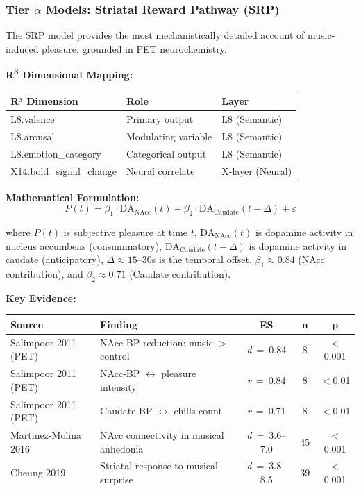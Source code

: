 \documentclass[9pt,onecolumn]{article}
\newcommand{\Rthree}{R\textsuperscript{3}}
\newcommand{\cohend}[1]{\textit{d}~=~#1}
\newcommand{\correlation}[1]{\textit{r}~=~#1}
\begin{document}
\subsubsection{Tier $\alpha$ Models: Striatal Reward Pathway (SRP)}

The SRP model provides the most mechanistically detailed account of music-induced pleasure, grounded in PET neurochemistry.

\textbf{\Rthree{} Dimensional Mapping:}
\begin{center}
\small
\begin{tabular}{@{}lll@{}}
\toprule
\textbf{R³ Dimension} & \textbf{Role} & \textbf{Layer} \\
\midrule
L8.valence & Primary output & L8 (Semantic) \\
L8.arousal & Modulating variable & L8 (Semantic) \\
L8.emotion\_category & Categorical output & L8 (Semantic) \\
X14.bold\_signal\_change & Neural correlate & X-layer (Neural) \\
\bottomrule
\end{tabular}
\end{center}

\textbf{Mathematical Formulation:}
\begin{equation}
P(t) = \beta_1 \cdot \text{DA}_{\text{NAcc}}(t) + \beta_2 \cdot \text{DA}_{\text{Caudate}}(t - \Delta) + \varepsilon
\label{eq:srp}
\end{equation}

where $P(t)$ is subjective pleasure at time $t$, $\text{DA}_{\text{NAcc}}(t)$ is dopamine activity in nucleus accumbens (consummatory), $\text{DA}_{\text{Caudate}}(t-\Delta)$ is dopamine activity in caudate (anticipatory), $\Delta \approx 15$--30s is the temporal offset, $\beta_1 \approx 0.84$ (NAcc contribution), and $\beta_2 \approx 0.71$ (Caudate contribution).

\textbf{Key Evidence:}
\begin{center}
\small
\begin{tabular}{@{}llccc@{}}
\toprule
\textbf{Source} & \textbf{Finding} & \textbf{ES} & \textbf{n} & \textbf{p} \\
\midrule
Salimpoor 2011 (PET) & NAcc BP reduction: music $>$ control & \cohend{0.84} & 8 & $<$0.001 \\
Salimpoor 2011 (PET) & NAcc-BP $\leftrightarrow$ pleasure intensity & \correlation{0.84} & 8 & $<$0.01 \\
Salimpoor 2011 (PET) & Caudate-BP $\leftrightarrow$ chills count & \correlation{0.71} & 8 & $<$0.01 \\
Martinez-Molina 2016 & NAcc connectivity in musical anhedonia & \cohend{3.6--7.0} & 45 & $<$0.001 \\
Cheung 2019 & Striatal response to musical surprise & \cohend{3.8--8.5} & 39 & $<$0.001 \\
\bottomrule
\end{tabular}
\end{center}
\end{document}
